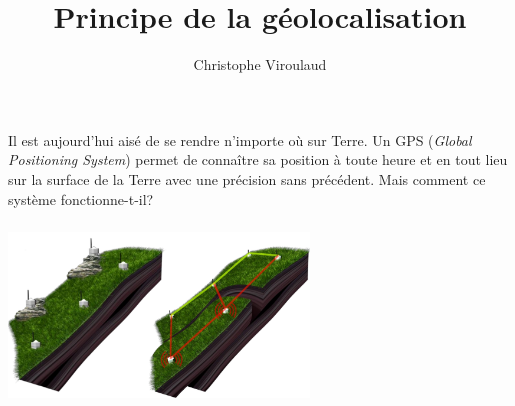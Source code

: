 \documentclass[svgnames,11pt]{beamer}
\author[]{Christophe Viroulaud}
\title{Principe de la géolocalisation}
\date{\framebox{\textbf{Loc 01}}}
\institute{Seconde - SNT}
\begin{document}
\begin{frame}
    \titlepage
\end{frame}

\begin{frame}
    \frametitle{}

    Il est aujourd'hui aisé de se rendre n'importe où sur Terre. Un GPS (\emph{Global Positioning System}) permet de connaître sa position à toute heure et en tout lieu sur la surface de la Terre avec une précision sans précédent. Mais comment ce système fonctionne-t-il?


\end{frame}
\begin{frame}
    \frametitle{}

    \begin{center}
        \centering
        \includegraphics[width=8cm]{ressources/supersauze.png}
        \label{IMG}
    \end{center}

\end{frame}
\begin{frame}
    \frametitle{}

    \begin{center}
    \end{center}

\end{frame}
\end{document}
